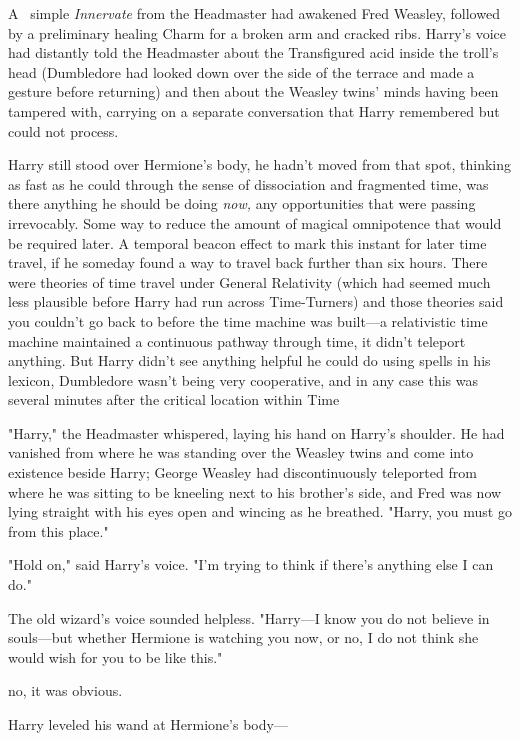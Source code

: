 
\lettrine{A}{~} simple
\emph{Innervate} from the Headmaster had awakened Fred Weasley, followed by a
preliminary healing Charm for a broken arm and cracked ribs. Harry's voice had
distantly told the Headmaster about the Transfigured acid inside the troll's
head (Dumbledore had looked down over the side of the terrace and made a
gesture before returning) and then about the Weasley twins' minds having been
tampered with, carrying on a separate conversation that Harry remembered but
could not process.

Harry still stood over Hermione's body, he hadn't moved from that spot,
thinking as fast as he could through the sense of dissociation and fragmented
time, was there anything he should be doing \emph{now,} any opportunities that
were passing irrevocably. Some way to reduce the amount of magical omnipotence
that would be required later. A temporal beacon effect to mark this instant for
later time travel, if he someday found a way to travel back further than six
hours. There were theories of time travel under General Relativity (which had
seemed much less plausible before Harry had run across Time-Turners) and those
theories said you couldn't go back to before the time machine was built---a
relativistic time machine maintained a continuous pathway through time, it
didn't teleport anything. But Harry didn't see anything helpful he could do
using spells in his lexicon, Dumbledore wasn't being very cooperative, and in
any case this was several minutes after the critical location within Time

"Harry," the Headmaster whispered, laying his hand on Harry's shoulder. He had
vanished from where he was standing over the Weasley twins and come into
existence beside Harry; George Weasley had discontinuously teleported from where
he was sitting to be kneeling next to his brother's side, and Fred was now
lying straight with his eyes open and wincing as he breathed. "Harry, you must
go from this place."

"Hold on," said Harry's voice. "I'm trying to think if there's anything else I
can do."

The old wizard's voice sounded helpless. "Harry---I know you do not believe in
souls---but whether Hermione is watching you now, or no, I do not think she
would wish for you to be like this."

{\el} no, it was obvious.

Harry leveled his wand at Hermione's body\mbox{---}

